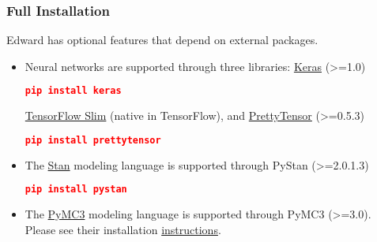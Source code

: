 \subsubsection{Full Installation}

Edward has optional features that depend on external packages.

\begin{itemize}
  \item Neural networks are supported through three
  libraries:
  \href{http://keras.io}{Keras} (>=1.0)
\begin{lstlisting}[language=JSON]
pip install keras
\end{lstlisting}
\href{https://github.com/tensorflow/tensorflow/tree/master/tensorflow/contrib/slim}{TensorFlow
Slim} (native in TensorFlow), and
\href{https://github.com/google/prettytensor}{PrettyTensor} (>=0.5.3)
\begin{lstlisting}[language=JSON]
pip install prettytensor
\end{lstlisting}
  \item The \href{http://mc-stan.org}{Stan} modeling language is supported
  through PyStan (>=2.0.1.3)
\begin{lstlisting}[language=JSON]
pip install pystan
\end{lstlisting}
  \item The \href{http://pymc-devs.github.io/pymc3/}{PyMC3} modeling language is supported
  through PyMC3 (>=3.0). Please see their installation
  \href{http://pymc-devs.github.io/pymc3/notebooks/getting_started.html}
  {instructions}.
\end{itemize}

